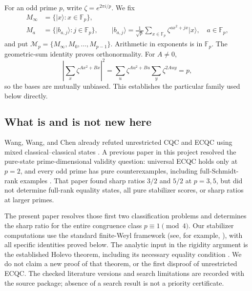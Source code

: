 \documentclass[11pt]{article}
\theoremstyle{remark}\newtheorem{remark}[theorem]{Remark}
\newcommand{\F}{\mathbb F}
\newcommand{\M}{\mathcal M}
\newcommand{\ket}[1]{\lvert#1\rangle}
\begin{document}
For an odd prime $p$, write $\zeta=e^{2\pi i/p}$. We fix
\begin{align}
 M_\infty&=\{\ket{x}:x\in\F_p\},\nonumber\\
 M_a&=\{\ket{b_{a,j}}:j\in\F_p\},\qquad
 \ket{b_{a,j}}=\frac1{\sqrt p}\sum_{x\in\F_p}\zeta^{a x^2+jx}\ket{x},
 \quad a\in\F_p,\label{eq:mub}
\end{align}
and put $\M_p=\{M_\infty,M_0,\ldots,M_{p-1}\}$. Arithmetic in exponents is in $\F_p$.
The geometric-sum identity proves orthonormality. For $A\ne0$,
\begin{equation}\label{eq:gauss}
 \left|\sum_x\zeta^{Ax^2+Bx}\right|^2
 =\sum_u\zeta^{Au^2+Bu}\sum_y\zeta^{2Auy}=p,
\end{equation}
so the bases are mutually unbiased. This establishes the particular family used below directly.

\subsection{What is and is not new here}
Wang, Wang, and Chen already refuted unrestricted CQC and ECQC using mixed classical--classical states \cite{wang}. A previous paper in this project resolved the pure-state prime-dimensional validity question: universal ECQC holds only at $p=2$, and every odd prime has pure counterexamples, including full-Schmidt-rank examples \cite{previous}. That paper found sharp ratios $3/2$ and $5/2$ at $p=3,5$, but did not determine full-rank equality states, all pure stabilizer scores, or sharp ratios at larger primes.

The present paper resolves those first two classification problems and determines the sharp ratio for the entire congruence class $p\equiv1\pmod4$. Our stabilizer computations use the standard finite-Weyl framework (see, for example, \cite{fattal}), with all specific identities proved below. The analytic input in the rigidity argument is the established Holevo theorem, including its necessary equality condition \cite{holevo,ruskai}. We do not claim a new proof of that theorem, or the first disproof of unrestricted ECQC. The checked literature versions and search limitations are recorded with the source package; absence of a search result is not a priority certificate.
\end{document}
